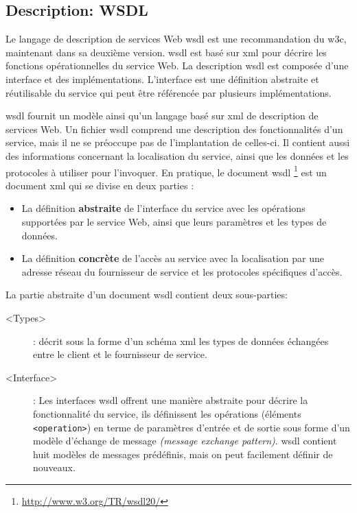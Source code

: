   \subsection{Description: WSDL}
  \label{sec:wsdl}
  Le langage de description de services Web \acrshort{wsdl}
  \cite{christensen2001web, chinnici2007web} est une recommandation du
  \acrshort{w3c}, maintenant dans sa deuxième version.
  \acrshort{wsdl} est basé sur \acrshort{xml} pour décrire les
  fonctions opérationnelles du service Web. La description
  \acrshort{wsdl} est composée d'une interface et des
  implémentations. L'interface est une définition abstraite et
  réutilisable du service qui peut être référencée par plusieurs
  implémentations.\medskip

  \acrshort{wsdl} fournit un modèle ainsi qu'un langage basé sur
  \acrshort{xml} de description de services Web. Un fichier
  \acrshort{wsdl} comprend une description des fonctionnalités d'un
  service, mais il ne se préoccupe pas de l'implantation de celles-ci.
  Il contient aussi des informations concernant la localisation du
  service, ainsi que les données et les protocoles à utiliser pour
  l'invoquer. En pratique, le document \acrshort{wsdl}
  \footnote{\url{http://www.w3.org/TR/wsdl20/}} est un document
  \acrshort{xml} qui se divise en deux parties
  \cite{elie2010}:\medskip

  \medskip

  \SpecialItem
  \begin{itemize}
  \item La définition \textbf{abstraite} de l'interface du service
    avec les opérations supportées par le service Web, ainsi que leurs
    paramètres et les types de données.

  \item La définition \textbf{concrète} de l'accès au service avec la
    localisation par une adresse réseau du fournisseur de service et
    les protocoles spécifiques d'accès.\medskip
  \end{itemize}
  \enddescription

  La partie abstraite d'un document \acrshort{wsdl} contient deux
  sous-parties:\medskip

  \renewcommand{\descriptionlabel}[1]{\hspace{0.5cm}\textbullet~\texttt{#1}}
  \begin{description}
  \item[<Types>]: décrit sous la forme d'un schéma \acrshort{xml} les
    types de données échangées entre le client et le fournisseur de
    service.

  \item[<Interface>]: Les interfaces \acrshort{wsdl} offrent une
    manière abstraite pour décrire la fonctionnalité du service, ils
    définissent les opérations (éléments \texttt{<operation>}) en terme de
    paramètres d'entrée et de sortie sous forme d'un modèle
    d'échange de message \textit{(message exchange
      pattern)}. \acrshort{wsdl} contient huit modèles de messages
    prédéfinis, mais on peut facilement définir de nouveaux.\medskip
  \end{description}
  \enddescription

